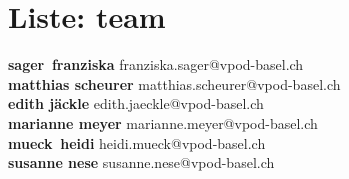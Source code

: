 \documentclass{scrartcl}
\begin{document}
\section*{Liste: team}
\textbf{sager\, franziska } franziska.sager@vpod-basel.ch\\
\textbf{matthias scheurer } matthias.scheurer@vpod-basel.ch\\
\textbf{edith jäckle } edith.jaeckle@vpod-basel.ch\\
\textbf{marianne meyer } marianne.meyer@vpod-basel.ch\\
\textbf{mueck\, heidi } heidi.mueck@vpod-basel.ch\\
\textbf{susanne nese } susanne.nese@vpod-basel.ch\\
\end{document}
